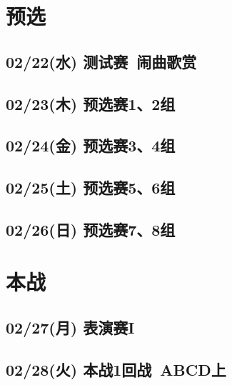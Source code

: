 
%

\setcounter{chapter}{0}

\chapter{预选}

\section{02/22(水) 测试赛~闹曲歌赏}
\section{02/23(木) 预选赛1、2组}
\section{02/24(金) 预选赛3、4组}
\section{02/25(土) 预选赛5、6组}
\section{02/26(日) 预选赛7、8组}

\chapter{本战}

\section{02/27(月) 表演赛I}
\section{02/28(火) 本战1回战~ABCD上}
